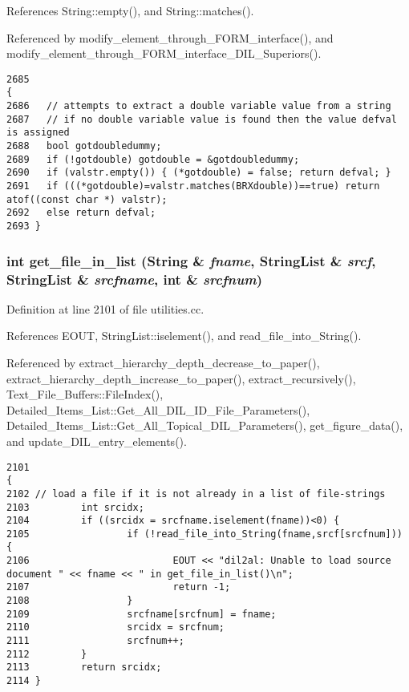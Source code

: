 References String::empty(), and String::matches().

Referenced by modify\_\-element\_\-through\_\-FORM\_\-interface(), and modify\_\-element\_\-through\_\-FORM\_\-interface\_\-DIL\_\-Superiors().



\footnotesize\begin{verbatim}2685                                                                                {
2686   // attempts to extract a double variable value from a string
2687   // if no double variable value is found then the value defval is assigned
2688   bool gotdoubledummy;
2689   if (!gotdouble) gotdouble = &gotdoubledummy;
2690   if (valstr.empty()) { (*gotdouble) = false; return defval; }
2691   if (((*gotdouble)=valstr.matches(BRXdouble))==true) return atof((const char *) valstr);
2692   else return defval;
2693 }
\end{verbatim}\normalsize 
{}
\subsubsection{\setlength{\rightskip}{0pt plus 5cm}int get\_\-file\_\-in\_\-list ({\bf String} \& {\em fname}, {\bf String\-List} \& {\em srcf}, {\bf String\-List} \& {\em srcfname}, int \& {\em srcfnum})}\label{utilities_8cc_a40}




Definition at line 2101 of file utilities.cc.

References EOUT, String\-List::iselement(), and read\_\-file\_\-into\_\-String().

Referenced by extract\_\-hierarchy\_\-depth\_\-decrease\_\-to\_\-paper(), extract\_\-hierarchy\_\-depth\_\-increase\_\-to\_\-paper(), extract\_\-recursively(), Text\_\-File\_\-Buffers::File\-Index(), Detailed\_\-Items\_\-List::Get\_\-All\_\-DIL\_\-ID\_\-File\_\-Parameters(), Detailed\_\-Items\_\-List::Get\_\-All\_\-Topical\_\-DIL\_\-Parameters(), get\_\-figure\_\-data(), and update\_\-DIL\_\-entry\_\-elements().



\footnotesize\begin{verbatim}2101                                                                                              {
2102 // load a file if it is not already in a list of file-strings
2103         int srcidx;
2104         if ((srcidx = srcfname.iselement(fname))<0) {
2105                 if (!read_file_into_String(fname,srcf[srcfnum])) {
2106                         EOUT << "dil2al: Unable to load source document " << fname << " in get_file_in_list()\n";
2107                         return -1;
2108                 }
2109                 srcfname[srcfnum] = fname;
2110                 srcidx = srcfnum;
2111                 srcfnum++;
2112         }
2113         return srcidx;
2114 }
\end{verbatim}\normalsize 
{}
